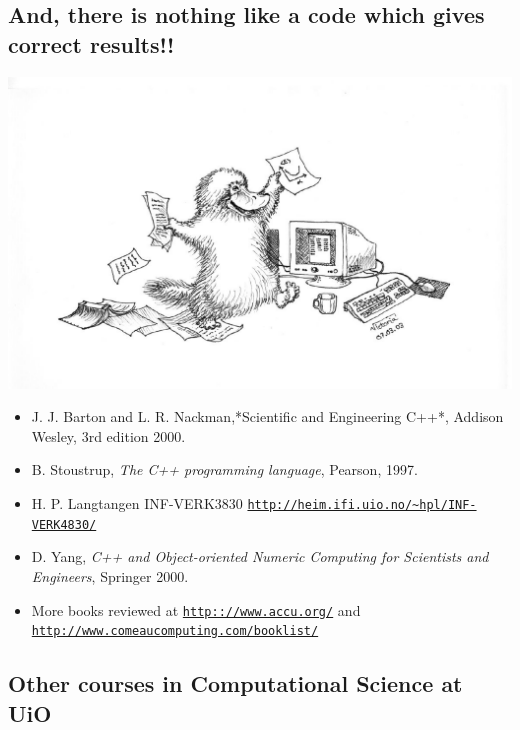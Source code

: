 \documentclass[%
oneside,                 %
final,                   %
10pt]{article}
\begin{document}
\noindent
\subsection{And, there is nothing like a code which gives correct results!!}



\centerline{\includegraphics[width=0.6\linewidth]{fig-slides/Nebbdyr2.pdf}}



\begin{itemize}
 \item J. J. Barton and L. R. Nackman,*Scientific and Engineering C++*, Addison Wesley, 3rd edition 2000.

 \item B. Stoustrup, \emph{The C++ programming language}, Pearson, 1997.

 \item H. P. Langtangen INF-VERK3830 \href{{http://heim.ifi.uio.no/~hpl/INF-VERK4830/}}{\nolinkurl{http://heim.ifi.uio.no/~hpl/INF-VERK4830/}}

 \item D. Yang, \emph{C++ and Object-oriented Numeric Computing for Scientists and Engineers}, Springer 2000.

 \item More books reviewed at \href{{http:://www.accu.org/}}{\nolinkurl{http:://www.accu.org/}} and \href{{http://www.comeaucomputing.com/booklist/}}{\nolinkurl{http://www.comeaucomputing.com/booklist/}}
\end{itemize}

\noindent
\subsection{Other courses in Computational Science at UiO}


\end{document}

